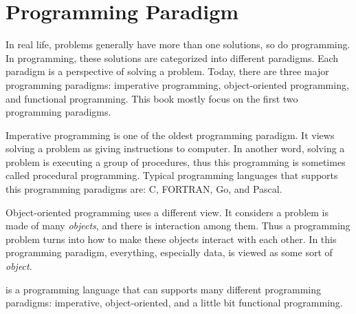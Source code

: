 \documentclass[../main.tex]{subfiles}
\begin{document}
    \section{Programming Paradigm}
    In real life, problems generally have more than one solutions, so do
    programming. In programming, these solutions are categorized into different
    paradigms. Each paradigm is a perspective of solving a problem. Today, there
    are three major programming paradigms: imperative programming, object-oriented
    programming, and functional programming. This book mostly focus on the first
    two programming paradigms.

    Imperative programming is one of the oldest programming paradigm. It views
    solving a problem as giving instructions to computer. In another word,
    solving a problem is executing a group of procedures, thus this programming
    is sometimes called procedural programming. Typical programming languages that
    supports this programming paradigms are: C, FORTRAN, Go, and Pascal.

    Object-oriented programming uses a different view. It considers a problem is
    made of many \emph{objects}, and there is interaction among them. Thus a
    programming problem turns into how to make these objects interact with each
    other. In this programming paradigm, everything, especially data, is viewed
    as some sort of \emph{object}.

    \csharp is a programming language that can supports many different programming
    paradigms: imperative, object-oriented, and a little bit functional programming.
\end{document}
